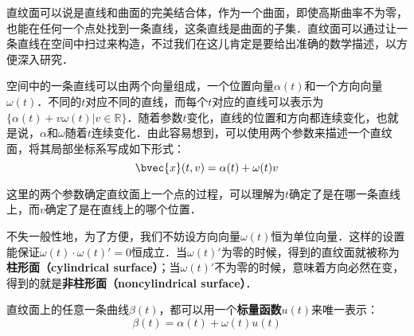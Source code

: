 
直纹面可以说是直线和曲面的完美结合体，作为一个曲面，即使高斯曲率不为零，也能在任何一个点处找到一条直线，这条直线是曲面的子集．直纹面可以通过让一条直线在空间中扫过来构造，不过我们在这儿肯定是要给出准确的数学描述，以方便深入研究．

空间中的一条直线可以由两个向量组成，一个位置向量$\alpha(t)$和一个方向向量$\omega(t)$．不同的$t$对应不同的直线，而每个$t$对应的直线可以表示为$\{\alpha(t)+v\omega(t)|v\in\mathbb{R}\}$．随着参数$t$变化，直线的位置和方向都连续变化，也就是说，$\alpha$和$\omega$随着$t$连续变化．由此容易想到，可以使用两个参数来描述一个直纹面，将其局部坐标系写成如下形式：
\begin{equation}
\bvec{x}(t, v)=\alpha(t)+\omega(t)v
\end{equation}

这里的两个参数确定直纹面上一个点的过程，可以理解为$t$确定了是在哪一条直线上，而$v$确定了是在直线上的哪个位置．

不失一般性地，为了方便，我们不妨设方向向量$\omega(t)$恒为单位向量．这样的设置能保证$\omega(t)\cdot\omega(t)'=0$恒成立．当$\omega(t)'$为零的时候，得到的直纹面就被称为\textbf{柱形面（cylindrical surface）}；当$\omega(t)'$不为零的时候，意味着方向必然在变，得到的就是\textbf{非柱形面（noncylindrical surface）}．

直纹面上的任意一条曲线$\beta(t)$，都可以用一个\textbf{标量函数}$u(t)$来唯一表示：\begin{equation}
\beta(t)=\alpha(t)+\omega(t)u(t)
\end{equation}







